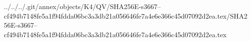 ../../../.git/annex/objects/K4/QV/SHA256E-s3667--cf494b7148fe5a1f94fdda06bc3a3db21a056646fe7a4e6e366c45d07092d2ea.tex/SHA256E-s3667--cf494b7148fe5a1f94fdda06bc3a3db21a056646fe7a4e6e366c45d07092d2ea.tex
